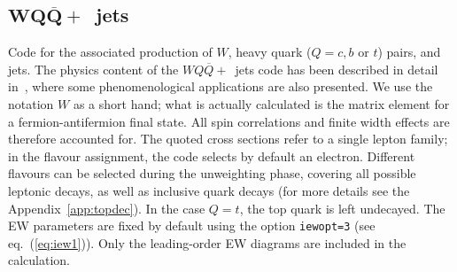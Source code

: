\documentclass[paper]{JHEP3}
\def    \Qbar   {\overline{Q}}
\begin{document}
\subsection{$\mathbf{WQ\Qbar+}$~jets}
\label{sec:wqq}
Code for the associated production of $W$, heavy quark ($Q=c,b$ or
$t$) pairs, and jets.  
The physics content of the  $WQ\Qbar+$~jets code has been described in detail
in~\cite{Mangano:2001xp}, where some phenomenological applications are
also presented. We use the notation $W$ as a short hand; what is
actually calculated is the matrix element for a fermion-antifermion final
state. All spin correlations and finite width effects are therefore
accounted for.  
The quoted cross sections refer to a single lepton
family; in the flavour assignment, the code selects by default an
electron. Different flavours can be selected during the unweighting
phase, covering all possible leptonic decays, as well as inclusive
quark decays (for more details see the Appendix~\ref{app:topdec}).
In the case $Q=t$, the top quark is left undecayed.
The EW parameters are fixed by default using the option {\tt iewopt=3}
(see eq.~(\ref{eq:iew1})). Only the leading-order EW diagrams are
included in the calculation.
\end{document}
